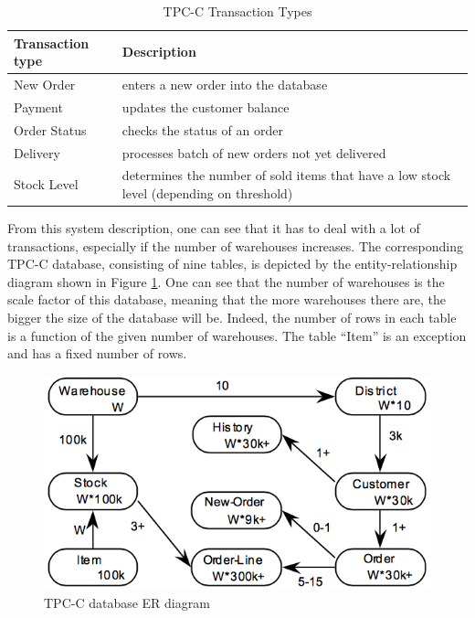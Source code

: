 \begin{table}[h]
	\centering
	\begin{tabular}{|m{4cm}|m{9cm}|}
		\hline
		\textbf{Transaction type} & \textbf{Description}\\
		\hline
		New Order & enters a new order into the database\\
		\hline
		Payment & updates the customer balance\\
		\hline
		Order Status & checks the status of an order\\
		\hline
		Delivery & processes batch of new orders not yet delivered\\
		\hline
		Stock Level & determines the number of sold items that have a low stock level (depending on threshold)\\
		\hline
	\end{tabular}
	\caption{TPC-C Transaction Types}
	\label{table:tpcc_trans_type_list}
\end{table}

From this system description, one can see that it has to deal with a lot of transactions, especially if the number of warehouses increases.
The corresponding TPC-C database, consisting of nine tables, is depicted by the entity-relationship diagram shown in Figure \ref{fig:tpcc_erd}.
One can see that the number of warehouses is the scale factor of this database, meaning that the more warehouses there are, the bigger the size of the database will be.
Indeed, the number of rows in each table is a function of the given number of warehouses.
The table ``Item'' is an exception and has a fixed number of rows.

\begin{figure}[h]
	\centering
	\includegraphics[scale=0.5]{figures/tpcc_erd.png}
	\caption{TPC-C database ER diagram \cite[p. 11]{tpcc10}}
	\label{fig:tpcc_erd}
\end{figure}

